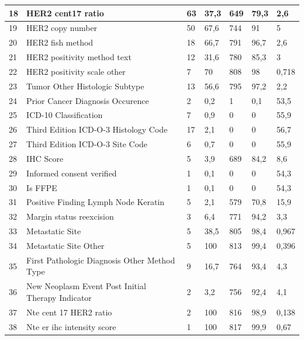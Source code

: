 \clearpage
\begin{table}[!htb]
	\footnotesize
	\centering
	\begin{threeparttable}
		\begin{tabular}{p{0.5cm} p{4cm} p{1.5cm} p{2cm} p{1.5cm} p{2cm} p{1.5cm}} \toprule
			18	&	HER2 cent17 ratio	&	63	&	37,3	&	649	&	79,3	&	2,6			
			\\ \hline	19	&	HER2 copy number	&	50	&	67,6	&	744	&	91	&	5
			\\ \hline	20	&	HER2 fish method	&	18	&	66,7	&	791	&	96,7	&	2,6
			\\ \hline	21	&	HER2 positivity method text	&	12	&	31,6	&	780	&	85,3	&	3
			\\ \hline	22	&	HER2 positivity scale other	&	7	&	70	&	808	&	98	&	0,718
			\\ \hline	23	&	Tumor Other Histologic Subtype	&	13	&	56,6	&	795	&	97,2	&	2,2
			\\ \hline	24	&	Prior Cancer Diagnosis Occurence	&	2	&	0,2	&	1	&	0,1	&	53,5
			\\ \hline	25	&	ICD-10 Classification	&	7	&	0,9	&	0	&	0	&	55,9
			\\ \hline	26	&	Third Edition ICD-O-3 Histology Code	&	17	&	2,1	&	0	&	0	&	56,7
			\\ \hline	27	&	Third Edition ICD-O-3 Site Code	&	6	&	0,7	&	0	&	0	&	55,9
			\\ \hline	28	&	IHC Score	&	5	&	3,9	&	689	&	84,2	&	8,6
			\\ \hline	29	&	Informed consent verified	&	1	&	0,1	&	0	&	0	&	54,3
			\\ \hline	30	&	Is FFPE	&	1	&	0,1	&	0	&	0	&	54,3
			\\ \hline	31	&	Positive Finding Lymph Node Keratin	&	5	&	2,1	&	579	&	70,8	&	15,9
			\\ \hline	32	&	Margin status reexcision	&	3	&	6,4	&	771	&	94,2	&	3,3
			\\ \hline	33	&	Metastatic Site	&	5	&	38,5	&	805	&	98,4	&	0,967
			\\ \hline	34	&	Metastatic Site Other	&	5	&	100	&	813	&	99,4	&	0,396
			\\ \hline	35	&	First Pathologic Diagnosis Other Method Type	&	9	&	16,7	&	764	&	93,4	&	4,3
			\\ \hline	36	&	New Neoplasm Event Post Initial Therapy Indicator	&	2	&	3,2	&	756	&	92,4	&	4,1
			\\ \hline	37	&	Nte cent 17 HER2 ratio	&	2	&	100	&	816	&	98,9	&	0,138
			\\ \hline	38	&	Nte er ihc intensity score	&	1	&	100	&	817	&	99,9	&	0,67

\end{tabular}
\end{threeparttable}
\end{table}
